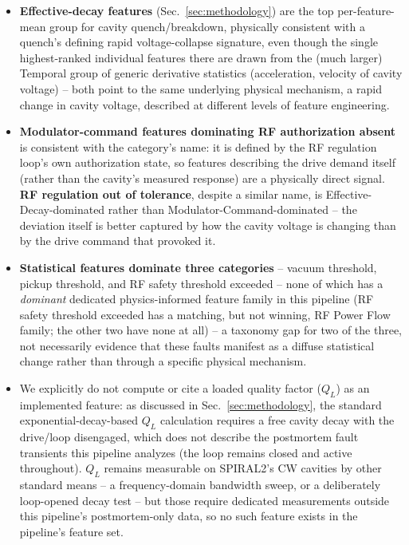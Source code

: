 \begin{itemize}
    \item \textbf{Effective-decay features} (Sec.~\ref{sec:methodology}) are the top per-feature-mean group for cavity quench/breakdown, physically consistent with a quench's defining rapid voltage-collapse signature, even though the single highest-ranked individual features there are drawn from the (much larger) Temporal group of generic derivative statistics (acceleration, velocity of cavity voltage) -- both point to the same underlying physical mechanism, a rapid change in cavity voltage, described at different levels of feature engineering.
    \item \textbf{Modulator-command features dominating RF authorization absent} is consistent with the category's name: it is defined by the RF regulation loop's own authorization state, so features describing the drive demand itself (rather than the cavity's measured response) are a physically direct signal. \textbf{RF regulation out of tolerance}, despite a similar name, is Effective-Decay-dominated rather than Modulator-Command-dominated -- the deviation itself is better captured by how the cavity voltage is changing than by the drive command that provoked it.
    \item \textbf{Statistical features dominate three categories} -- vacuum threshold, pickup threshold, and RF safety threshold exceeded -- none of which has a \emph{dominant} dedicated physics-informed feature family in this pipeline (RF safety threshold exceeded has a matching, but not winning, RF Power Flow family; the other two have none at all) -- a taxonomy gap for two of the three, not necessarily evidence that these faults manifest as a diffuse statistical change rather than through a specific physical mechanism.
    \item We explicitly do not compute or cite a loaded quality factor ($Q_L$) as an implemented feature: as discussed in Sec.~\ref{sec:methodology}, the standard exponential-decay-based $Q_L$ calculation requires a free cavity decay with the drive/loop disengaged, which does not describe the postmortem fault transients this pipeline analyzes (the loop remains closed and active throughout). $Q_L$ remains measurable on SPIRAL2's CW cavities by other standard means -- a frequency-domain bandwidth sweep, or a deliberately loop-opened decay test -- but those require dedicated measurements outside this pipeline's postmortem-only data, so no such feature exists in the pipeline's feature set.
\end{itemize}

